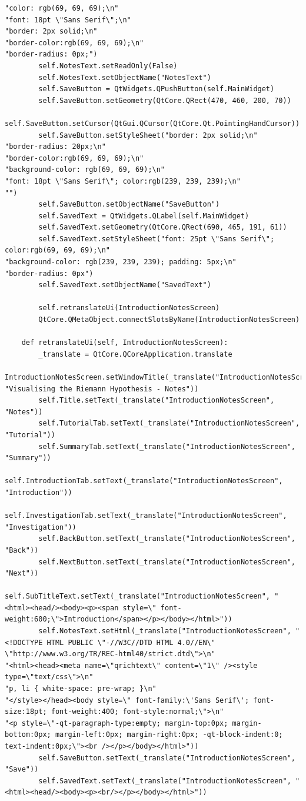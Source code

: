 \documentclass[12pt]{article}
\begin{document}
\begin{lstlisting}
"color: rgb(69, 69, 69);\n"
"font: 18pt \"Sans Serif\";\n"
"border: 2px solid;\n"
"border-color:rgb(69, 69, 69);\n"
"border-radius: 0px;")
        self.NotesText.setReadOnly(False)
        self.NotesText.setObjectName("NotesText")
        self.SaveButton = QtWidgets.QPushButton(self.MainWidget)
        self.SaveButton.setGeometry(QtCore.QRect(470, 460, 200, 70))
        self.SaveButton.setCursor(QtGui.QCursor(QtCore.Qt.PointingHandCursor))
        self.SaveButton.setStyleSheet("border: 2px solid;\n"
"border-radius: 20px;\n"
"border-color:rgb(69, 69, 69);\n"
"background-color: rgb(69, 69, 69);\n"
"font: 18pt \"Sans Serif\"; color:rgb(239, 239, 239);\n"
"")
        self.SaveButton.setObjectName("SaveButton")
        self.SavedText = QtWidgets.QLabel(self.MainWidget)
        self.SavedText.setGeometry(QtCore.QRect(690, 465, 191, 61))
        self.SavedText.setStyleSheet("font: 25pt \"Sans Serif\"; color:rgb(69, 69, 69);\n"
"background-color: rgb(239, 239, 239); padding: 5px;\n"
"border-radius: 0px")
        self.SavedText.setObjectName("SavedText")

        self.retranslateUi(IntroductionNotesScreen)
        QtCore.QMetaObject.connectSlotsByName(IntroductionNotesScreen)

    def retranslateUi(self, IntroductionNotesScreen):
        _translate = QtCore.QCoreApplication.translate
        IntroductionNotesScreen.setWindowTitle(_translate("IntroductionNotesScreen", "Visualising the Riemann Hypothesis - Notes"))
        self.Title.setText(_translate("IntroductionNotesScreen", "Notes"))
        self.TutorialTab.setText(_translate("IntroductionNotesScreen", "Tutorial"))
        self.SummaryTab.setText(_translate("IntroductionNotesScreen", "Summary"))
        self.IntroductionTab.setText(_translate("IntroductionNotesScreen", "Introduction"))
        self.InvestigationTab.setText(_translate("IntroductionNotesScreen", "Investigation"))
        self.BackButton.setText(_translate("IntroductionNotesScreen", "Back"))
        self.NextButton.setText(_translate("IntroductionNotesScreen", "Next"))
        self.SubTitleText.setText(_translate("IntroductionNotesScreen", "<html><head/><body><p><span style=\" font-weight:600;\">Introduction</span></p></body></html>"))
        self.NotesText.setHtml(_translate("IntroductionNotesScreen", "<!DOCTYPE HTML PUBLIC \"-//W3C//DTD HTML 4.0//EN\" \"http://www.w3.org/TR/REC-html40/strict.dtd\">\n"
"<html><head><meta name=\"qrichtext\" content=\"1\" /><style type=\"text/css\">\n"
"p, li { white-space: pre-wrap; }\n"
"</style></head><body style=\" font-family:\'Sans Serif\'; font-size:18pt; font-weight:400; font-style:normal;\">\n"
"<p style=\"-qt-paragraph-type:empty; margin-top:0px; margin-bottom:0px; margin-left:0px; margin-right:0px; -qt-block-indent:0; text-indent:0px;\"><br /></p></body></html>"))
        self.SaveButton.setText(_translate("IntroductionNotesScreen", "Save"))
        self.SavedText.setText(_translate("IntroductionNotesScreen", "<html><head/><body><p><br/></p></body></html>"))
\end{lstlisting}
\end{document}
